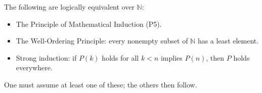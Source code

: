 \begin{remark}
The following are logically equivalent over $\mathbb{N}$:
\begin{itemize}
  \item The Principle of Mathematical Induction (P5).
  \item The Well-Ordering Principle: every nonempty subset of
        $\mathbb{N}$ has a least element.
  \item Strong induction: if $P(k)$ holds for all $k < n$ implies
        $P(n)$, then $P$ holds everywhere.
\end{itemize}
One must assume at least one of these; the others then follow.
\end{remark}

\medskip


